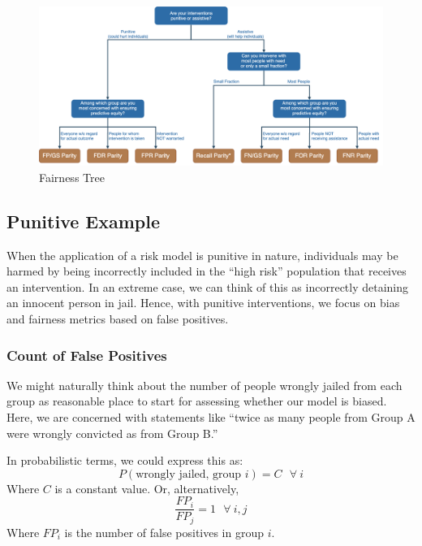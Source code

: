 \documentclass[]{krantz}
\begin{document}
\begin{figure}

{\centering \includegraphics[width=1\linewidth]{ChapterBias/figures/fairness_tree} 

}

\caption{Fairness Tree}\label{fig:fairness-tree}
\end{figure}

\hypertarget{sec:punitiveexample}{\subsection{Punitive
Example}\label{sec:punitiveexample}}

When the application of a risk model is punitive in nature, individuals
may be harmed by being incorrectly included in the ``high risk''
population that receives an intervention. In an extreme case, we can
think of this as incorrectly detaining an innocent person in jail.
Hence, with punitive interventions, we focus on bias and fairness
metrics based on false positives.

\subsubsection{Count of False Positives}\label{count-of-false-positives}

We might naturally think about the number of people wrongly jailed from
each group as reasonable place to start for assessing whether our model
is biased. Here, we are concerned with statements like ``twice as many
people from Group A were wrongly convicted as from Group B.''

In probabilistic terms, we could express this as:
\[P(\textrm{wrongly jailed, group $i$}) = C~~~\forall~i\] Where \(C\) is
a constant value. Or, alternatively,
\[\frac{FP_i}{FP_j} = 1~~~\forall~i,j\] Where \(FP_i\) is the number of
false positives in group \(i\).
\end{document}
